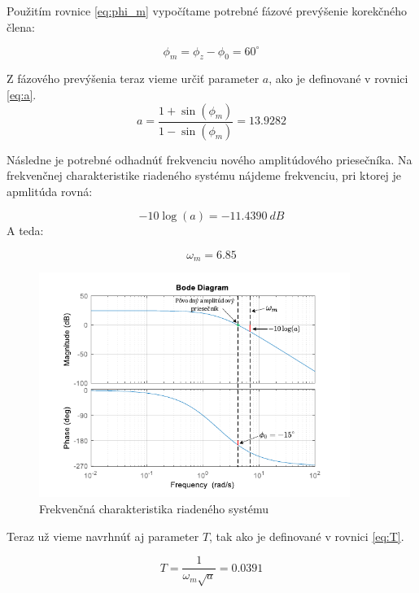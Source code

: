 \documentclass[a4paper,10pt]{article}
\begin{document}
Použitím rovnice \eqref{eq:phi_m} vypočítame potrebné fázové prevýšenie korekčného člena:

\begin{equation}
\phi_m=\phi_z-\phi_0=60^\circ
\end{equation}

Z fázového prevýšenia teraz vieme určiť parameter $a$, ako je definované v rovnici \eqref{eq:a}.
\begin{equation}
 a=\frac{1+\sin(\phi_m)}{1-\sin(\phi_m)}=13.9282
\end{equation} 

Následne je potrebné odhadnúť frekvenciu nového amplitúdového priesečníka.
Na frekvenčnej charakteristike riadeného systému nájdeme frekvenciu, pri ktorej je apmlitúda rovná:
 
\begin{equation}
 -10\log(a)=-11.4390\: dB
\end{equation}
A teda:

\begin{equation}
 \omega_m=6.85
\end{equation}

\begin{figure}[ht]
\centering
\includegraphics[width=0.9\textwidth]{SystemBode}
\caption{Frekvenčná charakteristika riadeného systému}
\end{figure}

\pagebreak

Teraz už vieme navrhnúť aj parameter $T$, tak ako je definované v rovnici \eqref{eq:T}.

\begin{equation}
 T=\frac{1}{\omega_m\sqrt{a}}=0.0391
\end{equation}  
\end{document}
